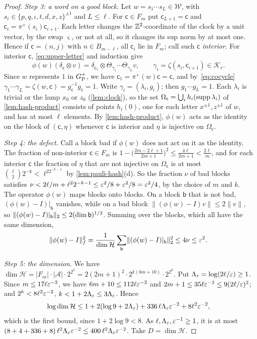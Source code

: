 \begin{proof}
\emph{Step 3: a word on a good block.} Let $w=s_1\cdots s_L\in\mathcal W$, with $s_i\in\{p,q,\iota,t,d,x,z\}^{\pm1}$ and $L\le\ell$. For
$\mathsf c\in F_m$ put $\mathsf c_{L+1}=\mathsf c$ and $\mathsf c_i=\pi^+(s_i)\mathsf c_{i+1}$. Each letter changes the $\mathbb Z^2$-coordinate of
the clock by a unit vector, by the swap $\varsigma$, or not at all, so it changes its sup norm by at most one. Hence if $\mathsf
c=(n,j)$ with $n\in B_{m-\ell}$, all $\mathsf c_i$ lie in $F_m$; call such $\mathsf c$ \emph{interior}. For interior $\mathsf c$,
\eqref{eq:upper-letter} and induction give
\[
\phi(w)(\delta_{\mathsf c}\otimes v)=\delta_{\mathsf c_1}\otimes\Theta_{\gamma_1}\cdots\Theta_{\gamma_L}v,\qquad\gamma_i=\zeta(s_i,\mathsf c_{i+1})\in\mathcal K_r .
\]
Since $w$ represents $1$ in $G_{\mathrm P}^{+}$, we have $\mathsf c_1=\pi^+(w)\mathsf c=\mathsf c$, and by~\eqref{eq:cocycle}
$\gamma_1\cdots\gamma_L=\zeta(w,\mathsf c)=g_{\mathsf c}^{-1}g_{\mathsf c}=1$. Write $\gamma_i=(\lambda_i,g_i)$; then $g_1\cdots g_L=1$. Each
$\lambda_i$ is trivial or the lamp $x_0$ or $z_0$ (\cref{lem:clock}), so the set $\Omega_{\mathsf c}=\bigcup_ih_i(\operatorname{supp}\lambda_i)$ of
\cref{lem:hash-product} consists of points $h_i(0)$, one for each letter $x^{\pm1},z^{\pm1}$ of $w$, and has at most $\ell$ elements. By
\cref{lem:hash-product}, $\phi(w)$ acts as the identity on the block of $(\mathsf c,\eta)$ whenever $\mathsf c$ is interior and $\eta$ is
injective on $\Omega_{\mathsf c}$.

\emph{Step 4: the defect.} Call a block bad if $\phi(w)$ does not act on it as the identity. The fraction of non-interior $\mathsf c\in F_m$
is $1-\bigl(\frac{2m-2\ell+1}{2m+1}\bigr)^2\le\frac{4\ell}{2m+1}<\frac{2\ell}m$, and for each interior $\mathsf c$ the fraction of $\eta$ that
are not injective on $\Omega_{\mathsf c}$ is at most $\binom\ell2 2^{-k}<\ell^22^{-k-1}$ by \cref{lem:pauli-hash}(d). So the fraction $\nu$
of bad blocks satisfies $\nu<2\ell/m+\ell^22^{-k-1}\le\varepsilon^2/8+\varepsilon^2/8=\varepsilon^2/4$, by the choice of $m$ and $k$. The operator $\phi(w)$ maps
blocks onto blocks. On a block $\mathsf b$ that is not bad, $(\phi(w)-I)|_{\mathsf b}$ vanishes, while on a bad block
$\lVert(\phi(w)-I)v\rVert\le2\lVert v\rVert$, so $\lVert (\phi(w)-I)|_{\mathsf b}\rVert_2\le2(\dim\mathsf b)^{1/2}$. Summing over the blocks, which all
have the same dimension,
\[
\lVert \phi(w)-I\rVert_f^2=\frac1{\dim\mathcal H}\sum_{\mathsf b}\lVert (\phi(w)-I)|_{\mathsf b}\rVert_2^2\le4\nu\le\varepsilon^2 .
\]

\emph{Step 5: the dimension.} We have $\dim\mathcal H=\lvert F_m\rvert\cdot\lvert\mathcal
A\rvert\cdot2^{2^k}=2(2m+1)^2\cdot2^{k(6m+10)}\cdot2^{2^k}$. Put $\Lambda_\varepsilon=\log(2\ell/\varepsilon)\ge1$. Since $m\le17\ell\varepsilon^{-2}$, we have
$6m+10\le112\ell\varepsilon^{-2}$ and $2m+1\le35\ell\varepsilon^{-2}\le9(2\ell/\varepsilon)^2$; and $2^k<8\ell^2\varepsilon^{-2}$, $k<1+2\Lambda_\varepsilon\le3\Lambda_\varepsilon$.
Hence
\[
\log\dim\mathcal H\le1+2(\log9+2\Lambda_\varepsilon)+336\,\ell\Lambda_\varepsilon\varepsilon^{-2}+8\ell^2\varepsilon^{-2},
\]
which is the first bound, since $1+2\log9<8$. As $\ell,\Lambda_\varepsilon,\varepsilon^{-1}\ge1$, it is at most
$(8+4+336+8)\,\ell^2\Lambda_\varepsilon\varepsilon^{-2}\le400\,\ell^2\Lambda_\varepsilon\varepsilon^{-2}$. Take $D=\dim\mathcal H$.
\end{proof}

